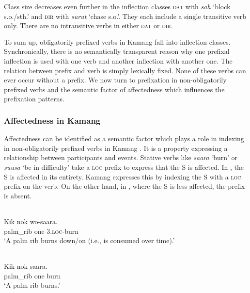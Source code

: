  

 



Class size decreases even further in the inflection classes  \textsc{dat} with \textit{sah} `block s.o./sth.' and \textsc{dir} with \textit{surut} `chase s.o.'. They each include a single transitive verb only. There are no intransitive verbs in either \textsc{dat} or \textsc{dir}.

  To sum up, obligatorily prefixed verbs in Kamang  fall into inflection classes. Synchronically, there is no semantically transparent reason why one prefixal inflection is used with one verb and another inflection with another one. The relation between prefix and verb is simply lexically fixed. None of these verbs can ever occur without a prefix. We now turn to prefixation in non-obligatorily prefixed verbs and the semantic factor of affectedness which influences the prefixation patterns. 

\subsubsection{Affectedness in Kamang}  
Affectedness can be identified as a semantic factor which plays a role in indexing in non-obligatorily prefixed verbs in Kamang . It is a property expressing a relationship between participants and events. Stative verbs like \textit{saara} `burn' or \textit{suusa} `be in difficulty' take a \textsc{loc} prefix to express that the S is affected. In , the S is affected in its entirety. Kamang  expresses this by indexing the S with a \textsc{loc} prefix on the verb. On the other hand, in , where the S is less affected, the prefix is absent.


\ea 
\label{ex:1239}
 \\ 
 \gll   Kik  nok  wo-saara.   \\
    palm\_rib  one  3\textsc{.loc-}burn   \\
 \glt  `A palm rib burns down/on (i.e., is consumed over time).'
\z



\ea 
\label{ex:1240}
 \\ 
 \gll   Kik  nok  saara.   \\
  palm\_rib  one  burn     \\
 \glt  `A palm rib burns.'
\z



